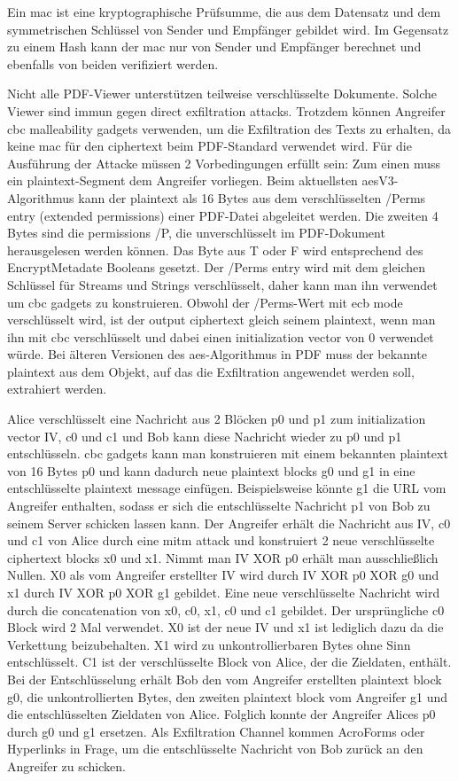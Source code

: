 Ein \gls{mac} ist eine kryptographische Prüfsumme, die aus dem Datensatz und dem symmetrischen Schlüssel von Sender und Empfänger gebildet wird. Im Gegensatz zu einem Hash kann der \gls{mac} nur von Sender und Empfänger berechnet und ebenfalls von beiden verifiziert werden. \cite{crypto-web}
\par
Nicht alle PDF-Viewer unterstützen teilweise verschlüsselte Dokumente. Solche Viewer sind immun gegen direct exfiltration attacks. Trotzdem können Angreifer \gls{cbc} malleability gadgets verwenden, um die Exfiltration des Texts zu erhalten, da keine \gls{mac} für den ciphertext beim PDF-Standard verwendet wird. Für die Ausführung der Attacke müssen 2 Vorbedingungen erfüllt sein: Zum einen muss ein plaintext-Segment dem Angreifer vorliegen. Beim aktuellsten \gls{aes}V3-Algorithmus kann der plaintext als 16 Bytes aus dem verschlüsselten /Perms entry (extended permissions) einer PDF-Datei abgeleitet werden. Die zweiten 4 Bytes sind die permissions /P, die unverschlüsselt im PDF-Dokument herausgelesen werden können. Das Byte aus T oder F wird entsprechend des EncryptMetadate Booleans gesetzt. Der /Perms entry wird mit dem gleichen Schlüssel für Streams und Strings verschlüsselt, daher kann man ihn verwendet um \gls{cbc} gadgets zu konstruieren. Obwohl der /Perms-Wert mit \gls{ecb} mode verschlüsselt wird, ist der output ciphertext gleich seinem plaintext, wenn man ihn mit \gls{cbc} verschlüsselt und dabei einen initialization vector von 0 verwendet würde. Bei älteren Versionen des \gls{aes}-Algorithmus in PDF muss der bekannte plaintext aus dem Objekt, auf das die Exfiltration angewendet werden soll, extrahiert werden. \cite{ccc-break-pdf, pdfex}
\par
Alice verschlüsselt eine Nachricht aus 2 Blöcken p0 und p1 zum initialization vector IV, c0 und c1 und Bob kann diese Nachricht wieder zu p0 und p1 entschlüsseln. \gls{cbc} gadgets kann man konstruieren mit einem bekannten plaintext von 16 Bytes p0 und kann dadurch neue plaintext blocks g0 und g1 in eine entschlüsselte plaintext message einfügen. Beispielsweise könnte g1 die URL vom Angreifer enthalten, sodass er sich die entschlüsselte Nachricht p1 von Bob zu seinem Server schicken lassen kann. Der Angreifer erhält die Nachricht aus IV, c0 und c1 von Alice durch eine \gls{mitm} attack und konstruiert 2 neue verschlüsselte ciphertext blocks x0 und x1. Nimmt man IV XOR p0 erhält man ausschließlich Nullen. X0 als vom Angreifer erstellter IV wird durch IV XOR p0 XOR g0 und x1 durch IV XOR p0 XOR g1 gebildet. Eine neue verschlüsselte Nachricht wird durch die concatenation von x0, c0, x1, c0 und c1 gebildet. Der ursprüngliche c0 Block wird 2 Mal verwendet. X0 ist der neue IV und x1 ist lediglich dazu da die Verkettung beizubehalten. X1 wird zu unkontrollierbaren Bytes ohne Sinn entschlüsselt. C1 ist der verschlüsselte Block von Alice, der die Zieldaten, enthält. Bei der Entschlüsselung erhält Bob den vom Angreifer erstellten plaintext block g0, die unkontrollierten Bytes, den zweiten plaintext block vom Angreifer g1 und die entschlüsselten Zieldaten von Alice. Folglich konnte der Angreifer Alices p0 durch g0 und g1 ersetzen. Als Exfiltration Channel kommen AcroForms oder Hyperlinks in Frage, um die entschlüsselte Nachricht von Bob zurück an den Angreifer zu schicken. \cite{gadget, pdf-insec-gadget, ccc-break-pdf}
